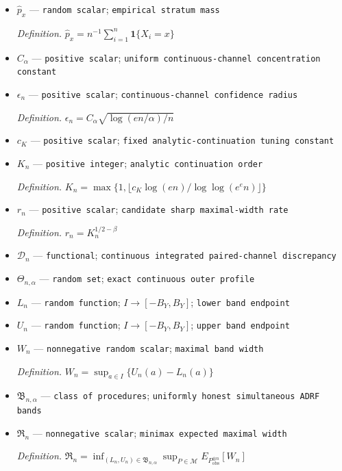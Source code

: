 \documentclass{article}
\begin{document}
\begin{itemize}
  \item \(\widehat p_x\) --- \texttt{random scalar}; \texttt{empirical stratum mass}
  \par\smallskip\noindent\emph{Definition.} \(\widehat p_x=n^{-1}\sum_{i=1}^n\mathbf 1\{X_i=x\}\)
  \item \(C_{\alpha}\) --- \texttt{positive scalar}; \texttt{uniform continuous-\allowbreak{}channel concentration constant}
  \item \(\epsilon_n\) --- \texttt{positive scalar}; \texttt{continuous-\allowbreak{}channel confidence radius}
  \par\smallskip\noindent\emph{Definition.} \(\epsilon_n=C_{\alpha}\sqrt{\log(en/\alpha)/n}\)
  \item \(c_K\) --- \texttt{positive scalar}; \texttt{fixed analytic-\allowbreak{}continuation tuning constant}
  \item \(K_n\) --- \texttt{positive integer}; \texttt{analytic continuation order}
  \par\smallskip\noindent\emph{Definition.} \(K_n=\max\{1,\lfloor c_K\log(en)/\log\log(e^e n)\rfloor\}\)
  \item \(r_n\) --- \texttt{positive scalar}; \texttt{candidate sharp maximal-\allowbreak{}width rate}
  \par\smallskip\noindent\emph{Definition.} \(r_n=K_n^{1/2-\beta}\)
  \item \(\mathscr D_n\) --- \texttt{functional}; \texttt{continuous integrated paired-\allowbreak{}channel discrepancy}
  \item \(\Theta_{n,\alpha}\) --- \texttt{random set}; \texttt{exact continuous outer profile}
  \item \(L_n\) --- \texttt{random function}; \(I\to[-B_Y,B_Y]\); \texttt{lower band endpoint}
  \item \(U_n\) --- \texttt{random function}; \(I\to[-B_Y,B_Y]\); \texttt{upper band endpoint}
  \item \(W_n\) --- \texttt{nonnegative random scalar}; \texttt{maximal band width}
  \par\smallskip\noindent\emph{Definition.} \(W_n=\sup_{a\in I}\{U_n(a)-L_n(a)\}\)
  \item \(\mathfrak B_{n,\alpha}\) --- \texttt{class of procedures}; \texttt{uniformly honest simultaneous ADRF bands}
  \item \(\mathfrak R_n\) --- \texttt{nonnegative scalar}; \texttt{minimax expected maximal width}
  \par\smallskip\noindent\emph{Definition.} \(\mathfrak R_n=\inf_{(L_n,U_n)\in\mathfrak B_{n,\alpha}}\sup_{P\in\mathcal M}E_{P_{\mathrm{obs}}^{\otimes n}}[W_n]\)

\end{itemize}
\end{document}
